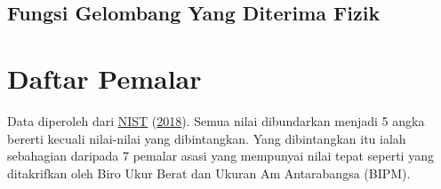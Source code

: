 \documentclass[
]{book}
\begin{document}
\hypertarget{fungsi-gelombang-yang-diterima-fizik}{%
\section{Fungsi Gelombang Yang Diterima
Fizik}\label{fungsi-gelombang-yang-diterima-fizik}}

\backmatter

\hypertarget{daftar-pemalar}{%
\chapter*{Daftar Pemalar}\label{daftar-pemalar}}

Data diperoleh dari \protect\hyperlink{ref-CODATA2018}{NIST}
(\protect\hyperlink{ref-CODATA2018}{2018}). Semua nilai dibundarkan
menjadi 5 angka bererti kecuali nilai-nilai yang dibintangkan. Yang
dibintangkan itu ialah sebahagian daripada 7 pemalar asasi yang
mempunyai nilai tepat seperti yang ditakrifkan oleh Biro Ukur Berat dan
Ukuran Am Antarabangsa (BIPM).
\end{document}
